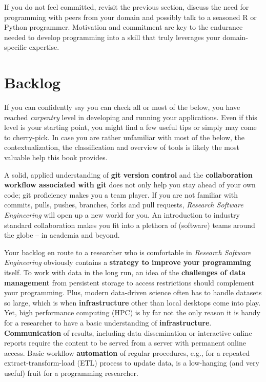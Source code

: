 \documentclass[
  12pt,
  letterpaper,
]{krantz}
\begin{document}
If you do not feel committed, revisit the previous section, discuss the
need for programming with peers from your domain and possibly talk to a
seasoned R or Python programmer. Motivation and commitment
are key to the endurance needed to develop programming into a skill that
truly leverages your domain-specific expertise.

\hypertarget{backlog}{%
\section{Backlog}\label{backlog}}

If you can confidently say you can check all or most of the below, you
have reached \emph{carpentry} level in developing and running your
applications. Even if this level is your starting point, you might find
a few useful tips or simply may come to cherry-pick. In case you are
rather unfamiliar with most of the below, the contextualization, the
classification and overview of tools is likely the most valuable help
this book provides.

A solid, applied understanding of \textbf{git version control} and the
\textbf{collaboration workflow associated with git} does not
only help you stay ahead of your own code; git proficiency makes you a
team player. If you are not familiar with commits, pulls, pushes,
branches, forks and pull requests, \emph{Research Software
Engineering} will open up a new world for you. An introduction to
industry standard collaboration makes you fit into a plethora of
(software) teams around the globe -- in academia and beyond.

Your backlog en route to a researcher who is comfortable in
\emph{Research Software Engineering} obviously contains a
\textbf{strategy to improve your programming} itself. To work with data
in the long run, an idea of the \textbf{challenges of data management}
from persistent storage to access restrictions should complement your
programming. Plus, modern data-driven science often has to handle
datasets so large, which is when
\textbf{infrastructure} other than local desktops
come into play. Yet, high performance computing (HPC) is by far not the
only reason it is handy for a researcher to have a basic understanding
of \textbf{infrastructure}. \textbf{Communication}
of results, including data dissemination or interactive online reports
require the content to be served from a server with permanent online
access. Basic workflow \textbf{automation} of regular
procedures, e.g., for a repeated extract-transform-load (ETL) process to
update data, is a low-hanging (and very useful) fruit for a programming
researcher.
\end{document}
